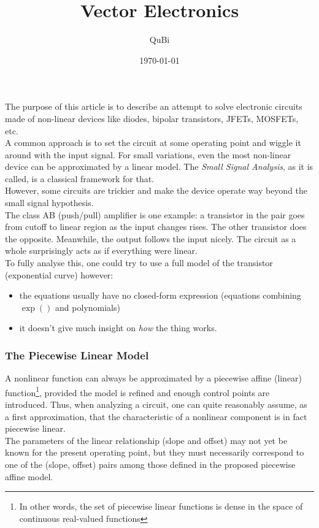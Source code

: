 \documentclass[10pt]{article}
\title{Vector Electronics}
\author{QuBi}
\date{\today}
\begin{document}
\maketitle

The purpose of this article is to describe an attempt to solve electronic circuits made of non-linear devices like diodes, bipolar transistors, JFETs, MOSFETs, etc.\\

A common approach is to set the circuit at some operating point and wiggle it around with the input signal.
For small variations, even the most non-linear device can be approximated by a linear model.
The \textit{Small Signal Analysis}, as it is called, is a classical framework for that.\\

However, some circuits are trickier and make the device operate way beyond the small signal hypothesis.\\
The class AB (push/pull) amplifier is one example: a transistor in the pair goes from cutoff to linear region as the input changes rises. 
The other transistor does the opposite. Meanwhile, the output follows the input nicely. The circuit as a whole surprisingly acts as if everything were linear.\\
To fully analyse this, one could try to use a full model of the transistor (exponential curve) however:
\begin{itemize}
	\item the equations usually have no closed-form expression (equations combining $\exp()$ and polynomials) 
	\item it doesn't give much insight on \textit{how} the thing works.
\end{itemize}

\subsubsection*{The Piecewise Linear Model}
A nonlinear function can always be approximated by a piecewise affine (linear) function\footnote{In other words, the set of piecewise linear functions is dense in the space of continuous real-valued functions}, 
provided the model is refined and enough control points are introduced.
Thus, when analyzing a circuit, one can quite reasonably assume, as a first approximation, that the characteristic of a nonlinear component is in fact piecewise linear. \\
The parameters of the linear relationship (slope and offset) may not yet be known for the present operating point, but they must necessarily correspond to one of the (slope, offset) pairs among those defined in the proposed piecewise affine model.\\
\end{document}
